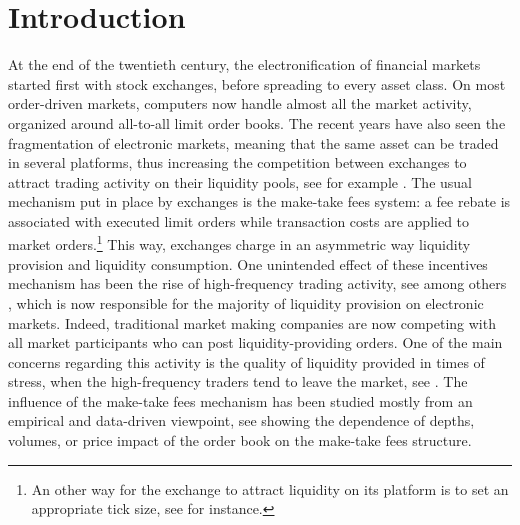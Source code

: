 \documentclass[11pt]{article}
\begin{document}
\vspace{6mm}

\section{Introduction}

At the end of the twentieth century, the electronification of financial markets started first with stock exchanges, before spreading to every asset class. On most order-driven markets, computers now handle almost all the market activity, organized around all-to-all limit order books. The recent years have also seen the fragmentation of electronic markets, meaning that the same asset can be traded in several platforms, thus increasing the competition between exchanges to attract trading activity on their liquidity pools, see for example \cite{laruelle2018market}. The usual mechanism put in place by exchanges is the make-take fees system: a fee rebate is associated with executed limit orders while transaction costs are applied to market orders.\footnote{An other way for the exchange to attract liquidity on its platform is to set an appropriate tick size, see \cite{baldacci2020bid, dayri2015large} for instance.} This way, exchanges charge in an asymmetric way liquidity provision
and liquidity consumption. One unintended effect of these incentives mechanism has been the rise of high-frequency trading activity, see among others \cite{arnuk2010concept}, which is now responsible for the majority of liquidity provision on electronic markets. Indeed, traditional market making companies are now competing with all market participants who can post liquidity-providing orders. One of the main concerns regarding this activity is the quality of liquidity provided in times of stress, when the high-frequency traders tend to leave the market, see \cite{bellia2017high, megarbane2017behavior,menkveld2013high,mirrlees2013strategies}. The influence of the make-take fees mechanism has been studied mostly from an empirical and data-driven viewpoint, see \cite{angel2011equity,brolley2013informed,colliard2012trading,harris1982asymmetric} showing the dependence of depths, volumes, or price impact of the order book on the make-take fees structure.\\
\end{document}
